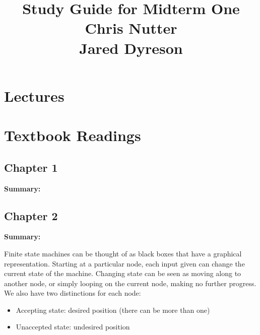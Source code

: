 \documentclass{article}[article]
\title{Study Guide for Midterm One \\
        Chris Nutter \\
        Jared Dyreson}
\begin{document}
\maketitle
\tableofcontents

\newpage

\section{Lectures}


\newpage

\section{Textbook Readings}

\vspace*{50px}

\subsection{Chapter 1}

\vspace*{25px}

\large{\textbf{Summary:}}

\newpage

\subsection{Chapter 2}

\vspace*{25px}

\large{\textbf{Summary:}}

Finite state machines can be thought of as black boxes that have a graphical representation.
Starting at a particular node, each input given can change the current state of the machine.
Changing state can be seen as moving along to another node, or simply looping on the current node, making no further progress.
We also have two distinctions for each node:

\begin{itemize}
\item Accepting state: desired position (there can be more than one)
\item Unaccepted state: undesired position
\end{itemize}
\end{document}
